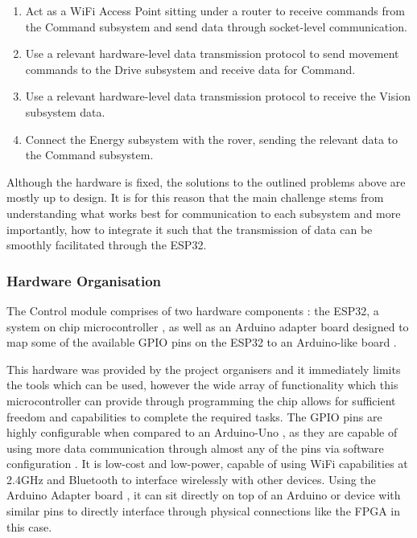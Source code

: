 \documentclass[a4paper]{article}
\begin{document}
\begin{enumerate}
    \item Act as a WiFi Access Point sitting under a router to receive
    commands from the Command subsystem and send data through 
    socket-level communication.
    \item Use a relevant hardware-level data transmission protocol to
    send movement commands to the Drive subsystem and receive data for 
    Command. 
    \item Use a relevant hardware-level data transmission protocol to 
    receive the Vision subsystem data.
    \item Connect the Energy subsystem with the rover, sending the 
    relevant data to the Command subsystem.
\end{enumerate}

Although the hardware is fixed, the solutions to the outlined problems
above are mostly up to design. It is for this reason that the main 
challenge stems from understanding what works best for communication 
to each subsystem and more importantly, how to integrate it such that 
the transmission of data can be smoothly facilitated through the ESP32.

\subsubsection{Hardware Organisation}

The Control module comprises of two hardware components \cite{BoxContent}: 
the ESP32, a system on chip microcontroller \cite{ESP32Datasheet}, as 
well as an Arduino adapter board designed to map some of the available 
GPIO pins on the ESP32 to an Arduino-like board \cite{ESP32ArduinoAdapter}.

This hardware was provided by the project organisers and it immediately 
limits the tools which can be used, however the wide array of functionality 
which this microcontroller can provide through programming the chip allows
for sufficient freedom and capabilities to complete the required tasks. The
GPIO pins are highly configurable when compared to an Arduino-Uno 
\cite{MicrocontrollerComparison}, as they are capable of using more data 
communication through almost any of the pins via software configuration 
\cite{ESP32PinOut}. It is low-cost and low-power, capable of using 
WiFi capabilities at 2.4GHz and Bluetooth \cite{ESP32Datasheet} to 
interface wirelessly with other devices. Using the Arduino Adapter 
board \cite{ESP32ArduinoAdapter}, it can sit directly on top of an 
Arduino or device with similar pins to directly interface through 
physical connections like the FPGA in this case. 
\end{document}
